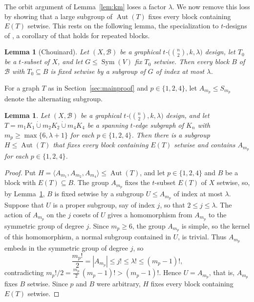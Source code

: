 \documentclass[12pt]{amsart}
\newtheorem{lemma}[theorem]{Lemma}
\theoremstyle{definition}
\DeclareMathOperator{\Sym}{Sym}
\DeclareMathOperator{\Aut}{Aut}
\newcommand{\dcup}{\mathbin{\dot\cup}}
\newcommand{\cB}{\mathcal{B}}
\begin{document}
The orbit argument of Lemma~\ref{lem:km} loses a factor $\lambda$. We now
remove this loss by showing that a large subgroup of $\Aut(T)$ fixes every
block containing $E(T)$ setwise. This rests on the following lemma, the
specialization to $t$-designs of \cite[Lemma 1.2]{Chouinard1996}, a
corollary of \cite[Theorem 2.1]{CKK1983} that holds for repeated blocks.

\begin{lemma}[Chouinard]
\label{lem:blockfix}
Let $(X, \cB)$ be a graphical $t$-$\bigl(\binom{n}{2}, k, \lambda\bigr)$
design, let $T_0$ be a $t$-subset of $X$, and let $G \leq \Sym(V)$ fix $T_0$
setwise. Then every block $B$ of $\cB$ with $T_0 \subseteq B$ is fixed
setwise by a subgroup of $G$ of index at most $\lambda$.
\end{lemma}

For a graph $T$ as in Section~\ref{sec:mainproof} and $p \in \{1, 2, 4\}$,
let $A_{m_p} \leq S_{m_p}$ denote the alternating subgroup.

\begin{lemma}
\label{lem:orbit}
Let $(X, \cB)$ be a graphical $t$-$\bigl(\binom{n}{2}, k, \lambda\bigr)$
design, and let $T = m_1 K_1 \dcup m_2 K_2 \dcup m_4 K_4$ be a spanning
$t$-edge subgraph of $K_n$ with $m_p \geq \max\{6, \lambda + 1\}$ for each
$p \in \{1, 2, 4\}$. Then there is a subgroup $H \leq \Aut(T)$ that fixes
every block containing $E(T)$ setwise and contains $A_{m_p}$ for each $p \in
\{1, 2, 4\}$.
\end{lemma}

\begin{proof}
Put $H = \langle A_{m_1}, A_{m_2}, A_{m_4} \rangle \leq \Aut(T)$, and let $p
\in \{1, 2, 4\}$ and $B$ be a block with $E(T) \subseteq B$. The group
$A_{m_p}$ fixes the $t$-subset $E(T)$ of $X$ setwise, so, by
Lemma~\ref{lem:blockfix}, $B$ is fixed setwise by a subgroup $U \leq
A_{m_p}$ of index at most $\lambda$. Suppose that $U$ is a proper subgroup,
say of index $j$, so that $2 \leq j \leq \lambda$. The action of $A_{m_p}$
on the $j$ cosets of $U$ gives a homomorphism from $A_{m_p}$ to the
symmetric group of degree $j$. Since $m_p \geq 6$, the group $A_{m_p}$ is
simple, so the kernel of this homomorphism, a normal subgroup contained in
$U$, is trivial. Thus $A_{m_p}$ embeds in the symmetric group of degree $j$,
so
\[
\frac{m_p!}{2} = |A_{m_p}| \leq j! \leq \lambda! \leq (m_p - 1)!,
\]
contradicting $m_p!/2 = \frac{m_p}{2}\,(m_p - 1)! > (m_p - 1)!$. Hence $U =
A_{m_p}$, that is, $A_{m_p}$ fixes $B$ setwise. Since $p$ and $B$ were
arbitrary, $H$ fixes every block containing $E(T)$ setwise.
\end{proof}
\end{document}
